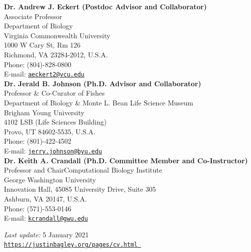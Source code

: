 \documentclass[margin,line]{res}
\begin{document}
\begin{resume}
\textbf{Dr. Andrew J. Eckert (Postdoc Advisor and Collaborator)} \\
Associate Professor \\
Department of Biology \\
Virginia Commonwealth University \\
1000 W Cary St, Rm 126 \\
Richmond, VA 23284-2012, U.S.A. \\
Phone: (804)-828-0800	 \\
E-mail: \href{mailto:aeckert2@vcu.edu}{\tt aeckert2@vcu.edu} \\

\textbf{Dr. Jerald B. Johnson (Ph.D. Advisor and Collaborator)} \\
Professor \& Co-Curator of Fishes \\
Department of Biology \& Monte L. Bean Life Science Museum \\
Brigham Young University \\
4102 LSB (Life Sciences Building) \\
Provo, UT 84602-5535, U.S.A. \\
Phone: (801)-422-4502	 \\
E-mail: \href{mailto:jerry.johnson@byu.edu}{\tt jerry.johnson@byu.edu}  \\

\textbf{Dr. Keith A. Crandall (Ph.D. Committee Member and Co-Instructor)} \\
Professor and Chair\textemdash Computational Biology Institute \\
George Washington University \\
Innovation Hall, 45085 University Drive, Suite 305 \\
Ashburn, VA 20147, U.S.A. \\
Phone: (571)-553-0146 \\
E-mail: \href{mailto:kcrandall@gwu.edu}{\tt kcrandall@gwu.edu} \\


\bigskip
\bigskip
\bigskip
\bigskip
\bigskip


\centering
\textit{Last update:} 5 January 2021 \\
\href{https://justinbagley.org/pages/cv.html }{\tt https://justinbagley.org/pages/cv.html }


\end{resume}
\end{document}

